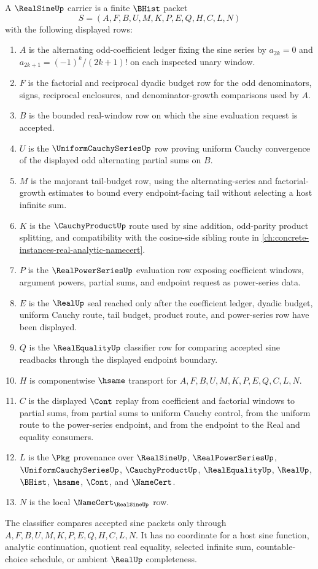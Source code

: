 \begin{definition}\label{def:real-sine-carrier}
A $\RealSineUp$ carrier is a finite $\BHist$ packet
$$
S=(A,F,B,U,M,K,P,E,Q,H,C,L,N)
$$
with the following displayed rows:
\begin{enumerate}
\item $A$ is the alternating odd-coefficient ledger fixing the sine series by $a_{2k}=0$ and $a_{2k+1}=(-1)^k/(2k+1)!$ on each inspected unary window.
\item $F$ is the factorial and reciprocal dyadic budget row for the odd denominators, signs, reciprocal enclosures, and denominator-growth comparisons used by $A$.
\item $B$ is the bounded real-window row on which the sine evaluation request is accepted.
\item $U$ is the $\UniformCauchySeriesUp$ row proving uniform Cauchy convergence of the displayed odd alternating partial sums on $B$.
\item $M$ is the majorant tail-budget row, using the alternating-series and factorial-growth estimates to bound every endpoint-facing tail without selecting a host infinite sum.
\item $K$ is the $\CauchyProductUp$ route used by sine addition, odd-parity product splitting, and compatibility with the cosine-side sibling route in \autoref{ch:concrete-instances-real-analytic-namecert}.
\item $P$ is the $\RealPowerSeriesUp$ evaluation row exposing coefficient windows, argument powers, partial sums, and endpoint request as power-series data.
\item $E$ is the $\RealUp$ seal reached only after the coefficient ledger, dyadic budget, uniform Cauchy route, tail budget, product route, and power-series row have been displayed.
\item $Q$ is the $\RealEqualityUp$ classifier row for comparing accepted sine readbacks through the displayed endpoint boundary.
\item $H$ is componentwise $\hsame$ transport for $A,F,B,U,M,K,P,E,Q,C,L,N$.
\item $C$ is the displayed $\Cont$ replay from coefficient and factorial windows to partial sums, from partial sums to uniform Cauchy control, from the uniform route to the power-series endpoint, and from the endpoint to the Real and equality consumers.
\item $L$ is the $\Pkg$ provenance over $\RealSineUp$, $\RealPowerSeriesUp$, $\UniformCauchySeriesUp$, $\CauchyProductUp$, $\RealEqualityUp$, $\RealUp$, $\BHist$, $\hsame$, $\Cont$, and $\NameCert$.
\item $N$ is the local $\NameCert_{\RealSineUp}$ row.
\end{enumerate}
The classifier compares accepted sine packets only through $A,F,B,U,M,K,P,E,Q,H,C,L,N$. It has no coordinate for a host sine function, analytic continuation, quotient real equality, selected infinite sum, countable-choice schedule, or ambient $\RealUp$ completeness.
\end{definition}

